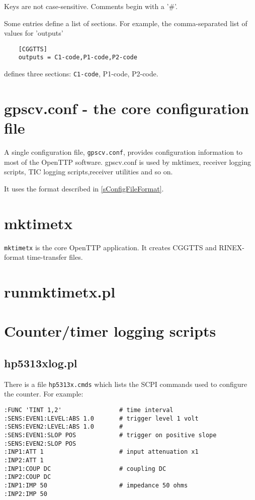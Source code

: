 \documentclass[11pt,a4paper,openany,oneside]{book}
\newcommand{\cc}[1]{{\small\texttt{#1}}}
\begin{document}
Keys are not case-sensitive. Comments begin with a '\#'.

Some entries define a list of sections. For example, the comma-separated list of values for 'outputs' 
\begin{lstlisting}
	[CGGTTS]
	outputs = C1-code,P1-code,P2-code
\end{lstlisting}
defines three sections: \cc{C1-code}, P1-code, P2-code.


\section{gpscv.conf - the core configuration file \label{sgpscvconf} }

A single configuration file, \cc{gpscv.conf}, provides configuration information to most of the
OpenTTP software. 
gpscv.conf is used by mktimex, receiver logging scripts, TIC logging scripts,receiver utilities and so on.

It uses the format described in \ref{sConfigFileFormat}.
\section{mktimetx}

\cc{mktimetx} is the core OpenTTP application. It creates CGGTTS and RINEX-format time-transfer files.


\section{runmktimetx.pl}

\section{Counter/timer logging scripts}

\subsection{hp5313xlog.pl}

There is a file \cc{hp5313x.cmds} which lists the SCPI commands used to configure the counter.
For example:
\begin{lstlisting}
:FUNC 'TINT 1,2'                # time interval
:SENS:EVEN1:LEVEL:ABS 1.0       # trigger level 1 volt
:SENS:EVEN2:LEVEL:ABS 1.0       #
:SENS:EVEN1:SLOP POS            # trigger on positive slope
:SENS:EVEN2:SLOP POS
:INP1:ATT 1                     # input attenuation x1
:INP2:ATT 1
:INP1:COUP DC                   # coupling DC
:INP2:COUP DC
:INP1:IMP 50                    # impedance 50 ohms
:INP2:IMP 50
\end{lstlisting}
\end{document}

